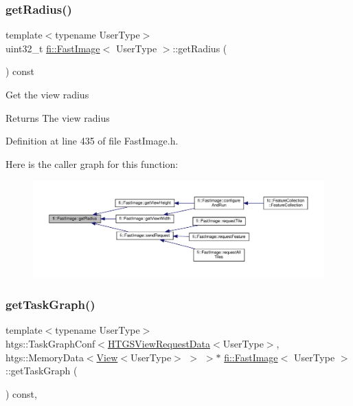 \subsubsection{\texorpdfstring{get\+Radius()}{getRadius()}}
{\footnotesize\ttfamily template$<$typename User\+Type$>$ \\
uint32\+\_\+t \hyperlink{classfi_1_1FastImage}{fi\+::\+Fast\+Image}$<$ User\+Type $>$\+::get\+Radius (\begin{DoxyParamCaption}{ }\end{DoxyParamCaption}) const\hspace{0.3cm}{\ttfamily [inline]}}

Get the view radius \begin{DoxyReturn}{Returns}
The view radius 
\end{DoxyReturn}


Definition at line 435 of file Fast\+Image.\+h.

Here is the caller graph for this function\+:
\nopagebreak
\begin{figure}[H]
\begin{center}
\leavevmode
\includegraphics[width=350pt]{dc/d6b/classfi_1_1FastImage_a17a18b7839a4fd6f8b1cfd2253983bd5_icgraph}
\end{center}
\end{figure}
\mbox{\label{classfi_1_1FastImage_a81ec16682f029e8d7f64888c6212066b}} 
\subsubsection{\texorpdfstring{get\+Task\+Graph()}{getTaskGraph()}}
{\footnotesize\ttfamily template$<$typename User\+Type$>$ \\
htgs\+::\+Task\+Graph\+Conf$<$\hyperlink{classfi_1_1HTGSViewRequestData}{H\+T\+G\+S\+View\+Request\+Data}$<$User\+Type$>$, htgs\+::\+Memory\+Data$<$\hyperlink{classfi_1_1View}{View}$<$User\+Type$>$ $>$ $>$$\ast$ \hyperlink{classfi_1_1FastImage}{fi\+::\+Fast\+Image}$<$ User\+Type $>$\+::get\+Task\+Graph (\begin{DoxyParamCaption}{ }\end{DoxyParamCaption}) const\hspace{0.3cm}{\ttfamily [inline]}, {\ttfamily [private]}}



